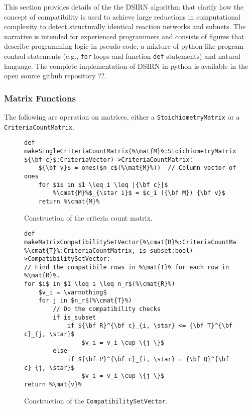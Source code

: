 \documentclass{article}
\newcommand{\mat}[1]{${\bf #1}$} %
\newcommand{\cmat}[1]{${\bf #1}^{\bf c}$} %
\begin{document}
This section provides details of the the DSIRN algorithm that clarify how the concept of compatibility is used to achieve large reductions in computational complexity to detect structurally identical reaction networks and subnets. The narrative is intended for experienced programmers and consists of figures that describe programming logic in pseudo code, a mixture of python-like program control statements (e.g., {\tt for} loops and function {\tt def} statements) and natural language. The complete implementation of DSIRN in python is available in the open source github repository ??.

\subsubsection{Matrix Functions}
The following are operation on matrices, either a {\tt StoichiometryMatrix} or a {\tt CriteriaCountMatrix}.

\begin{figure}
\begin{lstlisting}[mathescape=true,escapechar=\%]
def makeSingleCriteriaCountMatrix(%\mat{M}%:StoichiometryMatrix, ${\bf c}$:CriteriaVector)->CriteriaCountMatrix:
    ${\bf v}$ = ones($n_c$(%\mat{M}%))  // Column vector of ones
    for $i$ in $1 \leq i \leq |{\bf c}|$
        %\cmat{M}%$_{\star i}$ = $c_i ({\bf M}) {\bf v}$
    return %\cmat{M}%
\end{lstlisting}
\caption{Construction of the criteria count matrix.}\label{alg:makeCriteriaCountMatrix}
\end{figure}


\begin{figure}
\begin{lstlisting}[mathescape=true,escapechar=\%]
def makeMatrixCompatibilitySetVector(%\cmat{R}%:CriteriaCountMatrix, %\cmat{T}%:CriteriaCountMatrix, is_subset:bool)->CompatibilitySetVector:
// Find the compatibile rows in %\mat{T}% for each row in %\mat{R}%.
for $i$ in $1 \leq i \leq n_r$(%\cmat{R}%)
    $v_i = \varnothing$
    for j in $n_r$(%\cmat{T}%)
        // Do the compatibility checks
        if is_subset
            if ${\bf R}^{\bf c}_{i, \star} <= {\bf T}^{\bf c}_{j, \star}$
                $v_i = v_i \cup \{j \}$ 
        else
            if ${\bf P}^{\bf c}_{i, \star} = {\bf Q}^{\bf c}_{j, \star}$
                $v_i = v_i \cup \{j \}$
return %\mat{v}%
\end{lstlisting}
\caption{Construction of the {\tt CompatibilitySetVector}.}\label{alg:makeCompatibilitySetVector}
\end{figure}
\end{document}
